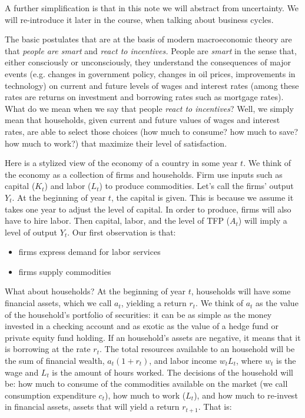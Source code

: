 \documentclass[letterpaper,12pt]{article}
\begin{document}
A further simplification is that in this note we will abstract
from uncertainty. We will re-introduce it later in the course,
when talking about business cycles.

The basic postulates that are at the basis of modern macroeconomic
theory are that \textit{people are smart} and \textit{react to
incentives.} People are \textit{smart} in the sense that, either
consciously or unconsciously, they understand the consequences of
major events (e.g. changes in government policy, changes in oil
prices, improvements in technology) on current and future levels
of wages and interest rates (among these rates are returns on
investment and borrowing rates such as mortgage rates). What do we
mean when we say that people \textit{react to incentives}? Well,
we simply mean that households, given current and future values of
wages and interest rates, are able to select those choices (how
much to consume? how much to save? how much to work?) that
maximize their level of satisfaction.

Here is a stylized view of the economy of a country in some year
$t$. We think of the economy as a collection of firms and
households. Firm use inputs such as capital ($K_{t}$) and labor
($L_{t}$) to produce commodities. Let's call the firms' output
$Y_{t}$. At the beginning of year $t$, the capital is given. This
is because we assume it takes one year to adjust the level of
capital. In order to produce, firms will also have to hire labor.
Then capital, labor, and the level of TFP ($A_{t}$) will imply a
level of output $Y_{t}$. Our first observation is that:

\begin{itemize}
\item firms express demand for labor services%
\item firms supply commodities%
\end{itemize}

What about households? At the beginning of year $t$, households
will have some financial assets, which we call $a_{t}$, yielding a
return $r_{t}$. We think of $a_{t}$ as the value of the
household's portfolio of securities: it can be as simple as the
money invested in a checking account and as exotic as the value of
a hedge fund or private equity fund holding. If an household's
assets are negative, it means that it is borrowing at the rate
$r_{t}$. The total resources available to an household will be the
sum of financial wealth, $a_{t}(1+r_{t})$, and labor income
$w_{t}L_{t}$, where $w_{t}$ is the wage and $L_{t}$ is the amount
of hours worked. The decisions of the household will be: how much
to consume of the commodities available on the market (we call
consumption expenditure $c_{t}$), how much to work ($L_{t}$), and
how much to re-invest in financial assets, assets that will yield
a return $r_{t+1}$. That is:
\end{document}
